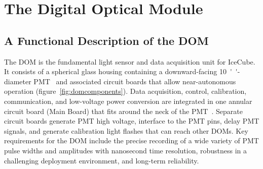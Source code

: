 
\newcommand{\degC}[1]{$\unit[#1]{^\circ{C}}$}
\def\lsim{\mathrel{\rlap{\raise 0.2ex\hbox{$\,<\,$}}{\lower 0.9ex\hbox{$\,\sim\,$}}}}
\def\gsim{\mathrel{\rlap{\raise 0.2ex\hbox{$\,>\,$}}{\lower 0.9ex\hbox{$\,\sim\,$}}}}


\section{\label{sec:dom}The Digital Optical Module}

\subsection{\label{sec:dom_functional}A Functional Description of the DOM}

The DOM is the fundamental light sensor and data acquisition unit for IceCube.
It consists of a spherical glass housing 
containing a downward-facing \SI{10}{''}-diameter PMT~\cite{ICECUBE:PMT}
and associated circuit boards that allow near-autonomous operation (figure~\ref{fig:domcomponents}).
Data acquisition, control, calibration, communication, and low-voltage power conversion 
are integrated in one annular circuit board (Main Board) that fits around the neck of the PMT~\cite{ICECUBE:DAQ}. 
Separate circuit boards generate PMT high voltage, interface to the PMT pins,
delay PMT signals, and generate calibration light flashes that can reach other DOMs.
Key requirements for the DOM include
the precise recording of a wide variety of PMT pulse widths and amplitudes
with nanosecond time resolution, robustness in 
a challenging deployment environment, and long-term reliability.


